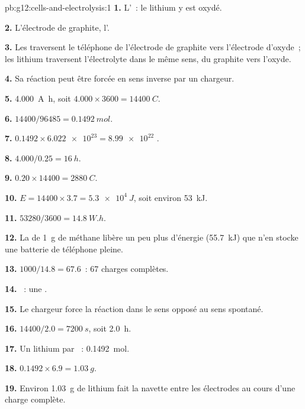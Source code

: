 \begin{solution}{pb:g12:cells-and-electrolysis:1}
\textbf{1.} L'~: le lithium y est oxydé.

\textbf{2.} L'électrode de graphite, l'.

\textbf{3.} Les  traversent le téléphone de l'électrode de
graphite vers l'électrode d'oxyde~; les  lithium traversent
l'électrolyte dans le même sens, du graphite vers l'oxyde.

\textbf{4.} Sa réaction peut être forcée en sens inverse par un
chargeur.

\textbf{5.} \qty{4.000}{A.h}, soit $4.000 \times 3600 =
\qty{14400}{C}$.

\textbf{6.} $14400/96485 = \qty{0.1492}{mol}$.

\textbf{7.} $0.1492 \times \num{6.022e23} = \num{8.99e22}$ .

\textbf{8.} $4.000/0.25 = \qty{16}{h}$.

\textbf{9.} $0.20 \times 14400 = \qty{2880}{C}$.

\textbf{10.} $E = 14400 \times 3.7 = \qty{5.3e4}{J}$, soit environ
\qty{53}{kJ}.

\textbf{11.} $53280/3600 = \qty{14.8}{W.h}$.

\textbf{12.} La  de \qty{1}{g} de méthane libère un peu plus
d'énergie (\qty{55.7}{kJ}) que n'en stocke une batterie de téléphone
pleine.

\textbf{13.} $1000/14.8 = 67.6$~: 67 charges complètes.

\textbf{14.} ~: une .

\textbf{15.} Le chargeur force la réaction dans le sens opposé au sens
spontané.

\textbf{16.} $14400/2.0 = \qty{7200}{s}$, soit \qty{2.0}{h}.

\textbf{17.} Un  lithium par ~: \qty{0.1492}{mol}.

\textbf{18.} $0.1492 \times 6.9 = \qty{1.03}{g}$.

\textbf{19.} Environ \qty{1.03}{g} de lithium fait la navette entre les
électrodes au cours d'une charge complète.
\end{solution}

